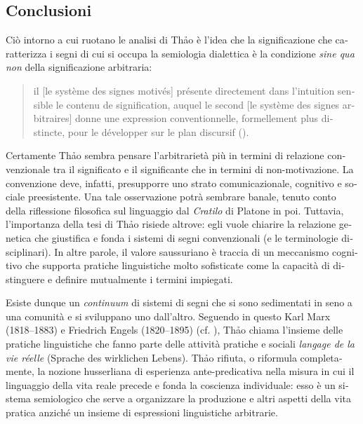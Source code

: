 \documentclass[output=paper]{../langscibook}
\begin{document}
\begin{otherlanguage}{italian}
\section{Conclusioni}

Ciò intorno a cui ruotano le analisi di Th\textlatin{ả}o è l’idea che la significazione che caratterizza i segni di cui si occupa la semiologia dialettica è la condizione \textit{sine qua non} della significazione arbitraria:

\begin{quote}
    il [le système des signes motivés] présente directement dans l’intuition sensible le contenu de signification, auquel le second [le système des signes arbitraires] donne une expression conventionnelle, formellement plus distincte, pour le développer sur le plan discursif (\citealt[40]{thao_phenomenologie_1974}).
\end{quote}

Certamente Th\textlatin{ả}o sembra pensare l’arbitrarietà più in termini di relazione convenzionale tra il significato e il significante che in termini di non-motivazione. La convenzione deve, infatti, presupporre uno strato comunicazionale, cognitivo e sociale preesistente. Una tale osservazione potrà sembrare banale, tenuto conto della riflessione filosofica sul linguaggio dal \textit{Cratilo} di Platone in poi. Tuttavia, l’importanza della tesi di Th\textlatin{ả}o risiede altrove: egli vuole chiarire la relazione genetica che giustifica e fonda i sistemi di segni convenzionali (e le terminologie disciplinari). In altre parole, il valore saussuriano è traccia di un meccanismo cognitivo che supporta pratiche linguistiche molto sofisticate come la capacità di distinguere e definire mutualmente i termini impiegati. 

Esiste dunque un \textit{continuum} di sistemi di segni che si sono sedimentati in seno a una comunità e si sviluppano uno dall’altro. Seguendo in questo Karl Marx (1818--1883) e Friedrich Engels (1820--1895) (cf. \citealt[26, 30--31, 331]{marx_marx-engels-werke_1958}), Th\textlatin{ả}o chiama l’insieme delle pratiche linguistiche che fanno parte delle attività pratiche e sociali \textit{langage de la vie réelle} (Sprache des wirklichen Lebens). Th\textlatin{ả}o rifiuta, o riformula completamente, la nozione husserliana di esperienza ante-predicativa nella misura in cui il linguaggio della vita reale precede e fonda la coscienza individuale: esso è un sistema semiologico che serve a organizzare la produzione e altri aspetti della vita pratica anziché un insieme di espressioni linguistiche arbitrarie.


\end{otherlanguage}
\end{document}
